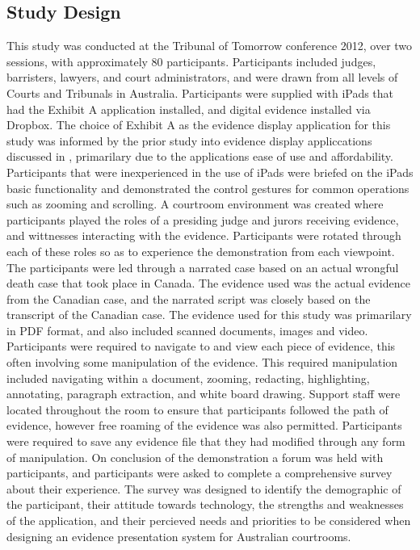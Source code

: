 \subsection{Study Design}
This study was conducted at the Tribunal of Tomorrow conference 2012, over two sessions, with approximately 80 participants. Participants included judges, barristers, lawyers, and court administrators, and were drawn from all levels of Courts and Tribunals in Australia.
Participants were supplied with iPads that had the Exhibit A application installed, and digital evidence installed via Dropbox. 
The choice of Exhibit A as the evidence display application for this study was informed by the prior study into evidence display appliccations discussed in , primarilary due to the applications ease of use and affordability.
Participants that were inexperienced in the use of iPads were briefed on the iPads basic functionality and demonstrated the control gestures for common operations such as zooming and scrolling.
A courtroom environment was created where participants played the roles  of a presiding judge and jurors receiving evidence, and wittnesses interacting with the evidence. Participants were rotated through each of these roles so as to experience the demonstration from each viewpoint. The participants were led through a narrated case based on an actual wrongful death case that took place in Canada. The evidence used was the actual evidence from the Canadian case, and the narrated script was closely based on the transcript of the Canadian case.
The evidence used for this study was primarilary in PDF format, and also included scanned documents, images and video. Participants were required to navigate to and view each piece of evidence, this often involving some manipulation of the evidence. This required manipulation included navigating within a document, zooming, redacting, highlighting, annotating, paragraph extraction, and white board drawing.
Support staff were located throughout the room to ensure that participants followed the path of evidence, however free roaming of the evidence was also permitted. Participants were required to save any evidence file that they had modified through any form of manipulation.
On conclusion of the demonstration a forum was held with participants, and participants were asked to complete a comprehensive survey about their experience. The survey was designed to identify the demographic of the participant, their attitude towards technology, the strengths and weaknesses of the application, and their percieved needs and priorities to be considered when designing an evidence presentation system for Australian courtrooms.

